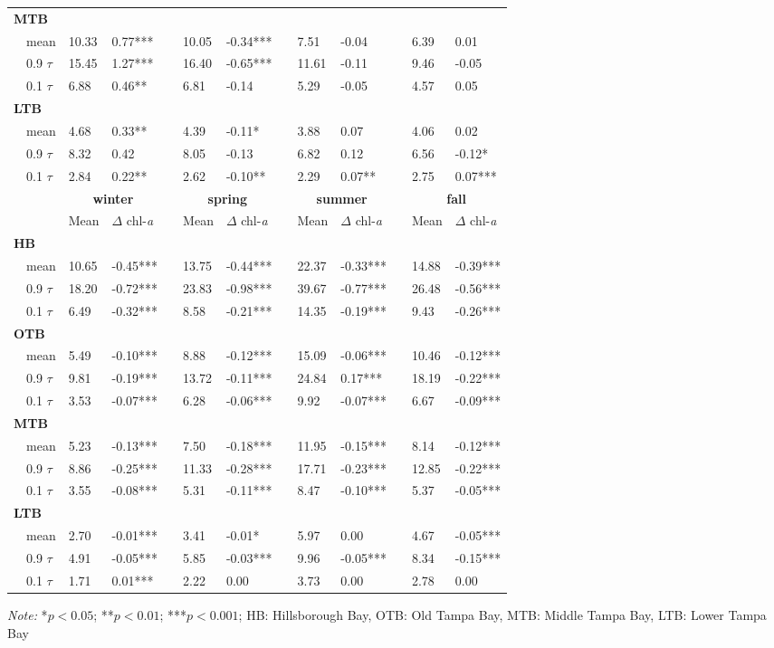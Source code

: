 \documentclass[letterpaper,12pt,oneside]{article}\usepackage[]{graphicx}\usepackage[]{color}
\begin{document}
\begin{table}[!tbp]
\begin{center}
\begin{tabular}{lllcllcllcll}
\hline
{\bfseries MTB}&&&&&&&&&&&\tabularnewline
~~mean&10.33& 0.77***&&10.05&-0.34***&& 7.51&-0.04 && 6.39& 0.01 \tabularnewline
~~0.9 $\tau$&15.45& 1.27***&&16.40&-0.65***&&11.61&-0.11 && 9.46&-0.05 \tabularnewline
~~0.1 $\tau$& 6.88& 0.46**&& 6.81&-0.14 && 5.29&-0.05 && 4.57& 0.05 \tabularnewline
\hline
{\bfseries LTB}&&&&&&&&&&&\tabularnewline
~~mean& 4.68& 0.33**&& 4.39&-0.11*&& 3.88& 0.07 && 4.06& 0.02 \tabularnewline
~~0.9 $\tau$& 8.32& 0.42 && 8.05&-0.13 && 6.82& 0.12 && 6.56&-0.12*\tabularnewline
~~0.1 $\tau$& 2.84& 0.22**&& 2.62&-0.10**&& 2.29& 0.07**&& 2.75& 0.07***\tabularnewline
\hline
\multicolumn{1}{l}{\bfseries }&\multicolumn{2}{c}{\bfseries {\bf winter}}&\multicolumn{1}{c}{\bfseries }&\multicolumn{2}{c}{\bfseries {\bf spring}}&\multicolumn{1}{c}{\bfseries }&\multicolumn{2}{c}{\bfseries {\bf summer}}&\multicolumn{1}{c}{\bfseries }&\multicolumn{2}{c}{\bfseries {\bf fall}}\tabularnewline
\cline{2-3} \cline{5-6} \cline{8-9} \cline{11-12}
~~&Mean&$\Delta$ chl-\textit{a}&&Mean&$\Delta$ chl-\textit{a}&&Mean&$\Delta$ chl-\textit{a}&&Mean&$\Delta$ chl-\textit{a}\tabularnewline
\hline
{\bfseries HB}&&&&&&&&&&&\tabularnewline
~~mean&10.65&-0.45***&&13.75&-0.44***&&22.37&-0.33***&&14.88&-0.39***\tabularnewline
~~0.9 $\tau$&18.20&-0.72***&&23.83&-0.98***&&39.67&-0.77***&&26.48&-0.56***\tabularnewline
~~0.1 $\tau$& 6.49&-0.32***&& 8.58&-0.21***&&14.35&-0.19***&& 9.43&-0.26***\tabularnewline
\hline
{\bfseries OTB}&&&&&&&&&&&\tabularnewline
~~mean& 5.49&-0.10***&& 8.88&-0.12***&&15.09&-0.06***&&10.46&-0.12***\tabularnewline
~~0.9 $\tau$& 9.81&-0.19***&&13.72&-0.11***&&24.84& 0.17***&&18.19&-0.22***\tabularnewline
~~0.1 $\tau$& 3.53&-0.07***&& 6.28&-0.06***&& 9.92&-0.07***&& 6.67&-0.09***\tabularnewline
\hline
{\bfseries MTB}&&&&&&&&&&&\tabularnewline
~~mean& 5.23&-0.13***&& 7.50&-0.18***&&11.95&-0.15***&& 8.14&-0.12***\tabularnewline
~~0.9 $\tau$& 8.86&-0.25***&&11.33&-0.28***&&17.71&-0.23***&&12.85&-0.22***\tabularnewline
~~0.1 $\tau$& 3.55&-0.08***&& 5.31&-0.11***&& 8.47&-0.10***&& 5.37&-0.05***\tabularnewline
\hline
{\bfseries LTB}&&&&&&&&&&&\tabularnewline
~~mean& 2.70&-0.01***&& 3.41&-0.01*&& 5.97& 0.00 && 4.67&-0.05***\tabularnewline
~~0.9 $\tau$& 4.91&-0.05***&& 5.85&-0.03***&& 9.96&-0.05***&& 8.34&-0.15***\tabularnewline
~~0.1 $\tau$& 1.71& 0.01***&& 2.22& 0.00 && 3.73& 0.00 && 2.78& 0.00 \tabularnewline
\hline
\end{tabular}
\end{center}
\footnotesize \textit{Note:} *$p<0.05$; **$p<0.01$; ***$p<0.001$; HB: Hillsborough Bay, OTB: Old Tampa Bay, MTB: Middle Tampa Bay, LTB: Lower Tampa Bay\end{table}
\end{document}
